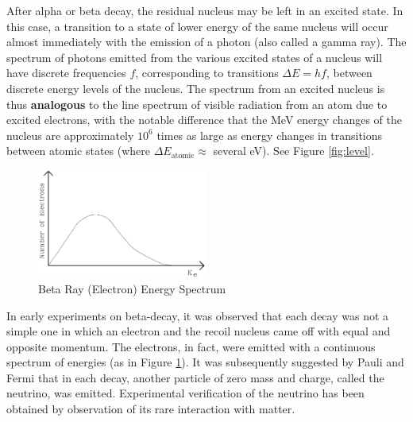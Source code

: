 After alpha or beta decay, the residual nucleus may be left in an excited state. In this case, a transition to a state of lower energy of the same nucleus will occur almost immediately with the emission of a photon (also called a gamma ray). The spectrum of photons emitted from the various excited states of a nucleus will have discrete frequencies $f$, corresponding to transitions $\Delta E=hf$, between discrete energy levels of the nucleus. The spectrum from an excited nucleus is thus \textbf{analogous} to the line spectrum of visible radiation from an atom due to excited electrons, with the notable difference that the MeV energy changes of the nucleus are approximately $10^6$ times as large as energy changes in transitions between atomic states (where $\Delta E_{\mathrm{atomic}}\approx$ several eV). See Figure {\ref{fig:level}}.\myskip

\begin{figure}[h]
\centering
\includegraphics[width=0.5\textwidth]{./Exp10/pic/image2.png}
\caption{Beta Ray (Electron) Energy Spectrum}
\label{fig:betaray}
\end{figure}

In early experiments on beta-decay, it was observed that each decay was not a simple one in which an electron and the recoil nucleus came off with equal and opposite momentum. The electrons, in fact, were emitted with a continuous spectrum of energies (as in Figure {\ref{fig:betaray}}). It was subsequently suggested by Pauli and Fermi that in each decay, another particle of zero mass and charge, called the neutrino, was emitted. Experimental verification of the neutrino has been obtained by observation of its rare interaction with matter.

